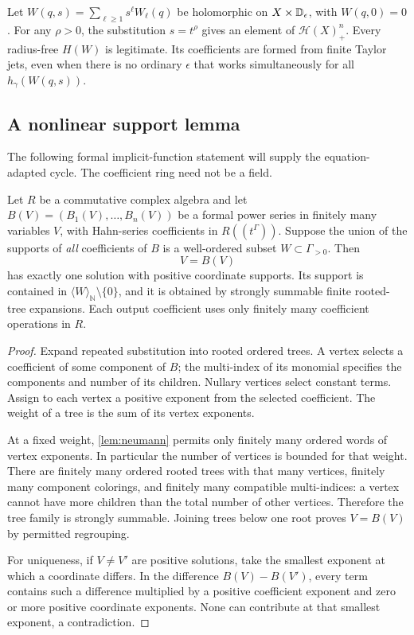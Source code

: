 \documentclass[11pt,letterpaper]{article}
\theoremstyle{definition}
\theoremstyle{remark}
\newcommand{\N}{\mathbb N}\newcommand{\Z}{\mathbb Z}\newcommand{\Q}{\mathbb Q}
\newcommand{\HH}{\mathscr H}\newcommand{\FF}{\mathscr F}
\newcommand{\powers}[1]{\langle #1\rangle_{\N}}
\numberwithin{equation}{section}
\begin{document}
\begin{corollary}\label{cor:radial}
Let $W(q,s)=\sum_{\ell\geq1}s^\ell W_\ell(q)$ be holomorphic on
$X\times\mathbb D_\epsilon$, with $W(q,0)=0$. For any $\rho>0$, the substitution
$s=t^\rho$ gives an element of $\HH(X)_+^n$. Every radius-free $H(W)$ is
legitimate. Its coefficients are formed from finite Taylor jets, even when
there is no ordinary $\epsilon$ that works simultaneously for all
$h_\gamma(W(q,s))$.
\end{corollary}

\subsection{A nonlinear support lemma}
The following formal implicit-function statement will supply the equation-adapted cycle. The coefficient ring need not be a field.

\begin{lemma}\label{lem:implicit}
Let $R$ be a commutative complex algebra and let
$B(V)=(B_1(V),\ldots,B_n(V))$ be a formal power series in finitely many
variables $V$, with Hahn-series coefficients in $R((t^\Gamma))$.
Suppose the union of the supports of \emph{all} coefficients of $B$ is a
well-ordered subset $W\subset\Gamma_{>0}$. Then
\[
 V=B(V)
\]
has exactly one solution with positive coordinate supports. Its support is
contained in $\powers W\setminus\{0\}$, and it is obtained by strongly
summable finite rooted-tree expansions. Each output coefficient uses only
finitely many coefficient operations in $R$.
\end{lemma}
\begin{proof}
Expand repeated substitution into rooted ordered trees. A vertex selects a
coefficient of some component of $B$; the multi-index of its monomial specifies
the components and number of its children. Nullary vertices select constant
terms. Assign to each vertex a positive exponent from the selected coefficient.
The weight of a tree is the sum of its vertex exponents.

At a fixed weight, \cref{lem:neumann} permits only finitely many ordered words
of vertex exponents. In particular the number of vertices is bounded for that
weight. There are finitely many ordered rooted trees with that many vertices,
finitely many component colorings, and finitely many compatible multi-indices:
a vertex cannot have more children than the total number of other vertices.
Therefore the tree family is strongly summable. Joining trees below one root
proves $V=B(V)$ by permitted regrouping.

For uniqueness, if $V\ne V'$ are positive solutions, take the smallest
exponent at which a coordinate differs. In the difference
$B(V)-B(V')$, every term contains such a difference multiplied by a positive
coefficient exponent and zero or more positive coordinate exponents. None can
contribute at that smallest exponent, a contradiction.
\end{proof}
\end{document}
